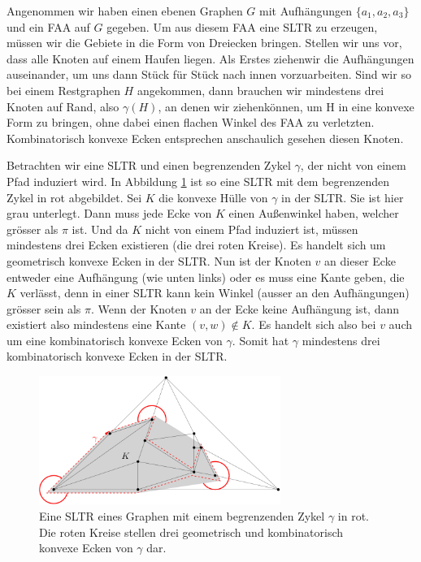 \begin{remark}
Angenommen wir haben einen ebenen Graphen $G$ mit Aufhängungen $\{a_1,a_2,a_3\}$ und ein FAA auf $G$ gegeben. Um aus diesem FAA eine SLTR zu erzeugen, müssen wir die Gebiete in die Form von Dreiecken bringen. Stellen wir uns vor, dass alle Knoten auf einem Haufen liegen. Als Erstes \glqq ziehen\grqq{ }wir die Aufhängungen auseinander, um uns dann Stück für Stück nach innen vorzuarbeiten. Sind wir so bei einem Restgraphen $H$ angekommen, dann brauchen wir mindestens drei Knoten auf Rand, also $\gamma(H)$, an denen wir \glqq ziehen\grqq{ }können, um H in eine konvexe Form zu bringen, ohne dabei einen flachen Winkel des FAA zu verletzten. Kombinatorisch konvexe Ecken entsprechen anschaulich gesehen diesen Knoten.
\end{remark}

\begin{example}
Betrachten wir eine SLTR und einen begrenzenden Zykel $\gamma$, der nicht von einem Pfad induziert wird. In Abbildung \ref{pic_exp_cycle} ist so eine SLTR mit dem begrenzenden Zykel in rot abgebildet. Sei $K$ die konvexe Hülle von $\gamma$ in der SLTR. Sie ist hier grau unterlegt. Dann muss jede Ecke von $K$ einen Außenwinkel haben, welcher grösser als $\pi$ ist. Und da $K$ nicht von einem Pfad induziert ist, müssen mindestens drei Ecken existieren (die drei roten Kreise). Es handelt sich um geometrisch konvexe Ecken in der SLTR. Nun ist der Knoten $v$ an dieser Ecke entweder eine Aufhängung (wie unten links) oder es muss eine Kante geben, die $K$ verlässt, denn in einer SLTR kann kein Winkel (ausser an den Aufhängungen) grösser sein als $\pi$. Wenn der Knoten $v$ an der Ecke keine Aufhängung ist, dann existiert also mindestens eine Kante $(v,w) \notin K$. Es handelt sich also bei $v$ auch um eine kombinatorisch konvexe Ecken von $\gamma$. Somit hat $\gamma$ mindestens drei kombinatorisch konvexe Ecken in der SLTR. 
\end{example}

\begin{figure}[h]
	\centering
  \includegraphics[width=0.7\textwidth]{exp_cycle.png}
  \caption{Eine SLTR eines Graphen mit einem begrenzenden Zykel $\gamma$ in rot. Die roten Kreise stellen drei geometrisch und kombinatorisch konvexe Ecken von $\gamma$ dar.}
  \label{pic_exp_cycle}
\end{figure}

